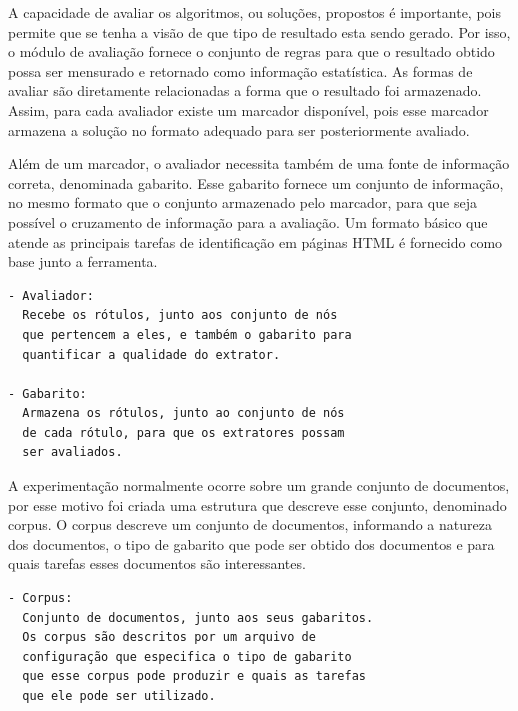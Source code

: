 \documentclass[12pt, a4paper]{article}
\begin{document}
A capacidade de avaliar os algoritmos, ou soluções, propostos é
importante, pois permite que se tenha a visão de que tipo de resultado
esta sendo gerado. Por isso, o módulo de avaliação fornece o conjunto de
regras para que o resultado obtido possa ser mensurado e retornado como
informação estatística. As formas de avaliar são diretamente
relacionadas a forma que o resultado foi armazenado. Assim, para cada
avaliador existe um marcador disponível, pois esse marcador armazena a
solução no formato adequado para ser posteriormente avaliado.


Além de um marcador, o avaliador necessita também de uma fonte de
informação correta, denominada gabarito. Esse gabarito fornece um
conjunto de informação, no mesmo formato que o conjunto armazenado pelo
marcador, para que seja possível o cruzamento de informação para a
avaliação. Um formato básico que atende as principais tarefas de
identificação em páginas HTML é fornecido como base junto a ferramenta.

\begin{verbatim}
- Avaliador:
  Recebe os rótulos, junto aos conjunto de nós
  que pertencem a eles, e também o gabarito para
  quantificar a qualidade do extrator.

- Gabarito: 
  Armazena os rótulos, junto ao conjunto de nós
  de cada rótulo, para que os extratores possam
  ser avaliados.
\end{verbatim}


A experimentação normalmente ocorre sobre um grande conjunto de
documentos, por esse motivo foi criada uma estrutura que descreve esse
conjunto, denominado corpus. O corpus descreve um conjunto de
documentos, informando a natureza dos documentos, o tipo de gabarito que
pode ser obtido dos documentos e para quais tarefas esses documentos são
interessantes.

\begin{verbatim}
- Corpus: 
  Conjunto de documentos, junto aos seus gabaritos.
  Os corpus são descritos por um arquivo de
  configuração que especifica o tipo de gabarito
  que esse corpus pode produzir e quais as tarefas
  que ele pode ser utilizado.
\end{verbatim}
\end{document}
